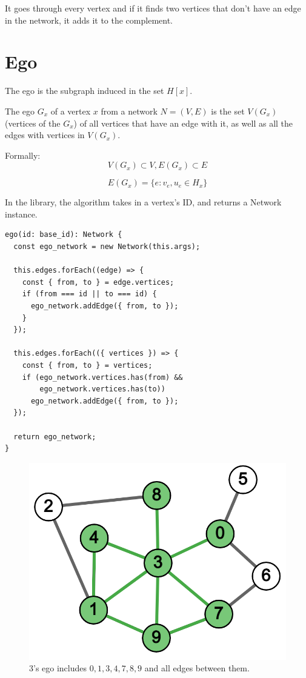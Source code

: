 It goes through every vertex and if it finds two vertices that don't have an edge in the network,
it adds it to the complement.

\section{Ego}

The ego is the subgraph induced in the set $H[x]$.

The ego $G_x$ of a vertex $x$ from a network $N=(V,E)$ is the set $V(G_x)$ (vertices of the $G_x$)
of all vertices that have an edge with it, as well as all the edges with vertices in $V(G_x)$.

Formally:
$$V(G_x) \subset V, E(G_x) \subset E$$

$$E(G_x)=\{e : v_e,u_e \in H_x\}$$

In the library, the algorithm takes in a vertex's ID, and returns a Network instance.
\begin{verbatim}
ego(id: base_id): Network {
  const ego_network = new Network(this.args);

  this.edges.forEach((edge) => {
    const { from, to } = edge.vertices;
    if (from === id || to === id) {
      ego_network.addEdge({ from, to });
    }
  });

  this.edges.forEach(({ vertices }) => {
    const { from, to } = vertices;
    if (ego_network.vertices.has(from) &&
        ego_network.vertices.has(to))
      ego_network.addEdge({ from, to });
  });

  return ego_network;
}
\end{verbatim}

\begin{figure}[H]
  \includegraphics[scale=.25]{img/ego_3.png}
  \caption{3's ego includes $0,1,3,4,7,8,9$ and all edges between them.}
  \label{fig:core_ex}
\end{figure}


